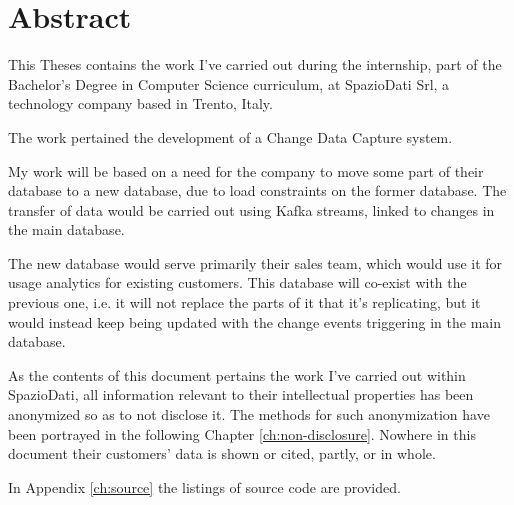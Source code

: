 \chapter*{Abstract} %
\label{ch:abstract}


%


This Theses contains the work I've carried out during the internship, part of the Bachelor's Degree in Computer Science curriculum, at SpazioDati Srl, a technology company based in Trento, Italy.

The work pertained the development of a Change Data Capture system.

My work will be based on a need for the company to move some part of their database to a new database, due to load constraints on the former database.
The transfer of data would be carried out using Kafka streams, linked to changes in the main database.

The new database would serve primarily their sales team, which would use it for usage analytics for existing customers.
This database will co-exist with the previous one, i.e. it will not replace the parts of it that it's replicating, but it would instead keep being updated with the change events triggering in the main database.


As the contents of this document pertains the work I've carried out within SpazioDati, all information relevant to their intellectual properties has been anonymized so as to not disclose it.
The methods for such anonymization have been portrayed in the following Chapter \ref{ch:non-disclosure}.
Nowhere in this document their customers' data is shown or cited, partly, or in whole.

In Appendix \ref{ch:source} the listings of source code are provided.
